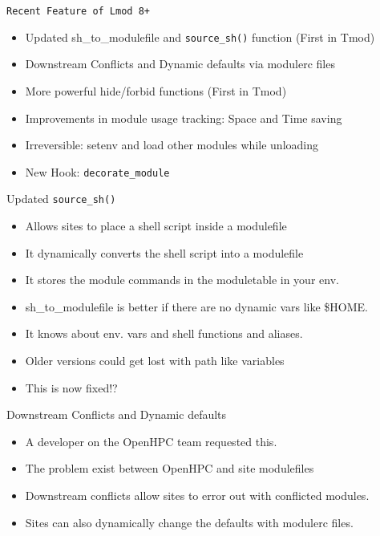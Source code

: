 \documentclass{beamer}
\begin{document}
\begin{frame}{\texttt{Recent Feature of Lmod 8+}}
  \begin{itemize}
    \item Updated sh\_to\_modulefile and \texttt{source\_sh()} function (First
      in Tmod)
    \item Downstream Conflicts and Dynamic defaults via modulerc files
    \item More powerful hide/forbid functions (First in Tmod)
    \item Improvements in module usage tracking: Space and Time saving
    \item Irreversible: setenv and load other modules while unloading
    \item New Hook: \texttt{decorate\_module}
  \end{itemize}
\end{frame}

\begin{frame}{Updated \texttt{source\_sh()}}
  \begin{itemize}
    \item Allows sites to place a shell script inside a modulefile
    \item It dynamically converts the shell script into a modulefile
    \item It stores the module commands in the moduletable in your
      env.
    \item sh\_to\_modulefile is better if there are no dynamic vars
      like \$HOME.
    \item It knows about env. vars and shell functions and aliases.
    \item Older versions could get lost with path like variables
    \item This is now fixed!?
  \end{itemize}
\end{frame}

\begin{frame}{Downstream Conflicts and Dynamic defaults}
  \begin{itemize}
    \item A developer on the OpenHPC team requested this.
    \item The problem exist between OpenHPC and site modulefiles
    \item Downstream conflicts allow sites to error out with
      conflicted modules.
    \item Sites can also dynamically change the defaults with modulerc files.
  \end{itemize}
\end{frame}
\end{document}
